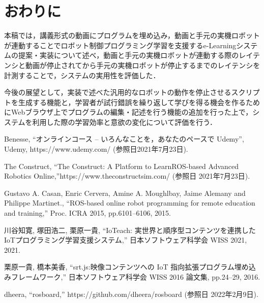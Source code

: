 \documentclass{ujarticle}
\begin{document}
\section{おわりに}
本稿では，講義形式の動画にプログラムを埋め込み，動画と手元の実機ロボットが連動することでロボット制御プログラミング学習を支援するe-Learningシステムの提案・実装について述べ，動画と手元の実機ロボットが連動する際のレイテンシと動画が停止されてから手元の実機ロボットが停止するまでのレイテンシを計測することで，システムの実用性を評価した．
\par 今後の展望として，実装で述べた汎用的なロボットの動作を停止させるスクリプトを生成する機能と，学習者が試行錯誤を繰り返して学びを得る機会を作るためにWebブラウザ上でプログラムの編集・記述を行う機能の追加を行った上で，システムを利用した際の学習効率と意欲の変化について評価を行う．



\footnotesize
\begin{thebibliography}{99}
Benesse, ``オンラインコース -- いろんなことを，あなたのペースで \textbar Udemy'', Udemy, https://www.udemy.com/ (参照日2021年7月23日).

The Construct, ``The Construct: A Platform to Learn\newline ROS-based Advanced Robotics Online,''\newline https://www.theconstructsim.com/ (参照日 2021年7月23日).

Gustavo A. Casan, Enric Cervera, Amine A. Moughlbay, Jaime Alemany and Philippe Martinet., ``ROS-based online robot programming for remote education and training,'' Proc. ICRA 2015, pp.6101--6106, 2015.

川谷知寛, 塚田浩二, 栗原一貴, ``IoTeach: 実世界と順序型コンテンツを連携したIoTプログラミング学習支援システム,'' 日本ソフトウェア科学会 WISS 2021, 2021.

栗原一貴, 橋本美香, ``srt.js:映像コンテンツへの IoT 指向拡張プログラム埋め込みフレームワーク,'' 日本ソフトウェア科学会 WISS 2016 論文集, pp.24--29, 2016.

dheera, ``rosboard,'' https://github.com/dheera/rosboard \newline(参照日 2022年2月9日).

\end{thebibliography}

\normalsize
\end{document}
